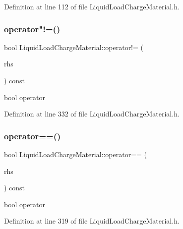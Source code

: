 Definition at line 112 of file Liquid\+Load\+Charge\+Material.\+h.

\mbox{\label{class_liquid_load_charge_material_aa6ad825ee8ab1c7816ce3bf10260c0bb}} 
\subsubsection{\texorpdfstring{operator"!=()}{operator!=()}}
{\footnotesize\ttfamily bool Liquid\+Load\+Charge\+Material\+::operator!= (\begin{DoxyParamCaption}\item[{const \hyperlink{class_liquid_load_charge_material}{Liquid\+Load\+Charge\+Material} \&}]{rhs }\end{DoxyParamCaption}) const\hspace{0.3cm}{\ttfamily [inline]}}

bool operator 

Definition at line 332 of file Liquid\+Load\+Charge\+Material.\+h.

\mbox{\label{class_liquid_load_charge_material_ad2090d1628f26e46339e9e164b47d3a2}} 
\subsubsection{\texorpdfstring{operator==()}{operator==()}}
{\footnotesize\ttfamily bool Liquid\+Load\+Charge\+Material\+::operator== (\begin{DoxyParamCaption}\item[{const \hyperlink{class_liquid_load_charge_material}{Liquid\+Load\+Charge\+Material} \&}]{rhs }\end{DoxyParamCaption}) const\hspace{0.3cm}{\ttfamily [inline]}}

bool operator 

Definition at line 319 of file Liquid\+Load\+Charge\+Material.\+h.

\mbox{\label{class_liquid_load_charge_material_a557c1f588cfb972ff0c7f748d6c2bd8f}} 
